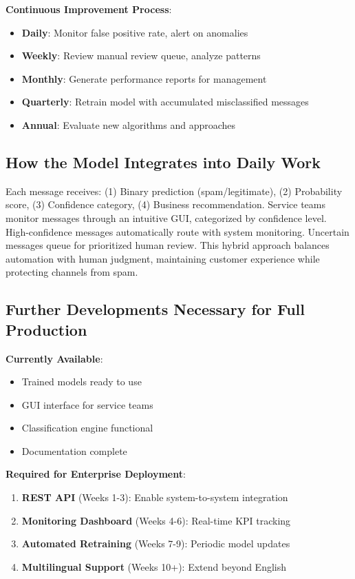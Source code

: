 \documentclass[12pt,a4paper]{article}
\begin{document}
\textbf{Continuous Improvement Process}:
\begin{itemize}
    \item \textbf{Daily}: Monitor false positive rate, alert on anomalies
    \item \textbf{Weekly}: Review manual review queue, analyze patterns
    \item \textbf{Monthly}: Generate performance reports for management
    \item \textbf{Quarterly}: Retrain model with accumulated misclassified messages
    \item \textbf{Annual}: Evaluate new algorithms and approaches
\end{itemize}

\subsection{How the Model Integrates into Daily Work}

Each message receives: (1) Binary prediction (spam/legitimate), (2) Probability score, (3) Confidence category, (4) Business recommendation. Service teams monitor messages through an intuitive GUI, categorized by confidence level. High-confidence messages automatically route with system monitoring. Uncertain messages queue for prioritized human review. This hybrid approach balances automation with human judgment, maintaining customer experience while protecting channels from spam.

\subsection{Further Developments Necessary for Full Production}

\textbf{Currently Available}:
\begin{itemize}
    \item Trained models ready to use
    \item GUI interface for service teams
    \item Classification engine functional
    \item Documentation complete
\end{itemize}

\textbf{Required for Enterprise Deployment}:
\begin{enumerate}
    \item \textbf{REST API} (Weeks 1-3): Enable system-to-system integration
    \item \textbf{Monitoring Dashboard} (Weeks 4-6): Real-time KPI tracking
    \item \textbf{Automated Retraining} (Weeks 7-9): Periodic model updates
    \item \textbf{Multilingual Support} (Weeks 10+): Extend beyond English
\end{enumerate}
\end{document}
